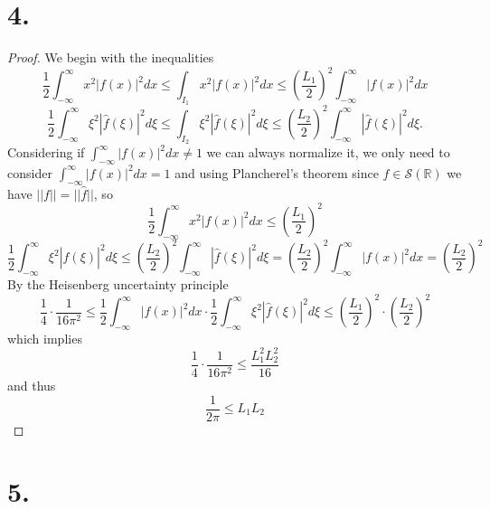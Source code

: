 \documentclass{article}
\begin{document}
\section*{4.}
\begin{proof}
    We begin with the inequalities
    \[
    \frac{1}{2} \int_{-\infty}^{\infty}x^2|f(x)|^2dx \leq \int_{I_1}x^2|f(x)|^2dx \leq \left(\frac{L_1}{2}\right)^2 \int_{-\infty}^{\infty}|f(x)|^2dx    
    \]
    \[
        \frac{1}{2} \int_{-\infty}^{\infty}\xi^2|\hat{f}(\xi)|^2d\xi \leq \int_{I_2}\xi^2|\hat{f}(\xi)|^2d\xi \leq \left(\frac{L_2}{2}\right)^2 \int_{-\infty}^{\infty}|\hat{f}(\xi)|^2d\xi.
    \]
    Considering if $\int_{-\infty}^{\infty} |f(x)|^2 dx \neq 1$ we can always normalize it, we only need to consider $\int_{-\infty}^{\infty}|f(x)|^2dx = 1$ and using Plancherel's theorem since $f \in \mathcal{S}(\mathbb{R})$ we have $||f|| = ||\hat{f}||$, so 
    \[
        \frac{1}{2} \int_{-\infty}^{\infty}x^2|f(x)|^2dx \leq \left(\frac{L_1}{2} \right)^2
    \]
    \[
        \frac{1}{2} \int_{-\infty}^{\infty}\xi^2|\hat{f}(\xi)|^2d\xi \leq \left(\frac{L_2}{2}\right)^2 \int_{-\infty}^{\infty}|\hat{f}(\xi)|^2d\xi = \left(\frac{L_2}{2}\right)^2 \int_{-\infty}^{\infty}|f(x)|^2dx = \left(\frac{L_2}{2}\right)^2
    \]
   By the Heisenberg uncertainty principle
   \[
   \frac{1}{4} \cdot \frac{1}{16\pi^2} \leq \frac{1}{2}\int_{-\infty}^{\infty}|f(x)|^2dx \cdot \frac{1}{2}\int_{-\infty}^{\infty}\xi^2|\hat{f}(\xi)|^2d \xi \leq  \left(\frac{L_1}{2}\right)^2\cdot \left(\frac{L_2}{2}\right)^2
   \]
   which implies 
   \[
   \frac{1}{4}\cdot \frac{1}{16\pi^2} \leq \frac{L_1^2L_2^2}{16} 
   \]
   and thus
   \[
   \frac{1}{2\pi}\leq L_1L_2 
   \]
\end{proof}
\section*{5.}
\end{document}
